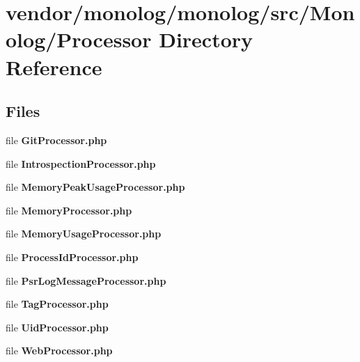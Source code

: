 \section{vendor/monolog/monolog/src/\+Monolog/\+Processor Directory Reference}
\label{dir_029b4a3a11a5b9a60331ec1f913857c2}
\subsection*{Files}
\begin{DoxyCompactItemize}
\item 
file {\bf Git\+Processor.\+php}
\item 
file {\bf Introspection\+Processor.\+php}
\item 
file {\bf Memory\+Peak\+Usage\+Processor.\+php}
\item 
file {\bf Memory\+Processor.\+php}
\item 
file {\bf Memory\+Usage\+Processor.\+php}
\item 
file {\bf Process\+Id\+Processor.\+php}
\item 
file {\bf Psr\+Log\+Message\+Processor.\+php}
\item 
file {\bf Tag\+Processor.\+php}
\item 
file {\bf Uid\+Processor.\+php}
\item 
file {\bf Web\+Processor.\+php}
\end{DoxyCompactItemize}
